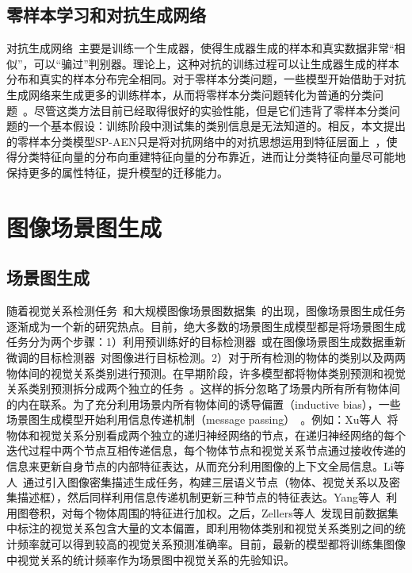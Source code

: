 \subsection{零样本学习和对抗生成网络}
对抗生成网络~\cite{goodfellow2014generative}主要是训练一个生成器，使得生成器生成的样本和真实数据非常“相似”，可以“骗过”判别器。理论上，这种对抗的训练过程可以让生成器生成的样本分布和真实的样本分布完全相同。对于零样本分类问题，一些模型开始借助于对抗生成网络来生成更多的训练样本，从而将零样本分类问题转化为普通的分类问题~\cite{mishra2018generative,xian2018feature,xian2019f}。尽管这类方法目前已经取得很好的实验性能，但是它们违背了零样本分类问题的一个基本假设：训练阶段中测试集的类别信息是无法知道的。相反，本文提出的零样本分类模型SP-AEN只是将对抗网络中的对抗思想运用到特征层面上~\cite{odena2017conditional,tzeng2017adversarial,makhzani2015adversarial,shrivastava2017learning}，使得分类特征向量的分布向重建特征向量的分布靠近，进而让分类特征向量尽可能地保持更多的属性特征，提升模型的迁移能力。



\section{图像场景图生成}

\subsection{场景图生成}
随着视觉关系检测任务~\cite{lu2016visual}和大规模图像场景图数据集~\cite{krishna2017visual}的出现，图像场景图生成任务逐渐成为一个新的研究热点。目前，绝大多数的场景图生成模型都是将场景图生成任务分为两个步骤：1）利用预训练好的目标检测器~\cite{lu2016visual,zhuang2017towards,zhang2017visual,dai2017detecting,yang2018shuffle,yu2017visual}或在图像场景图生成数据重新微调的目标检测器~\cite{li2017vip,xu2017scene,yin2018zoom,zellers2018neural,zhang2017relationship,zhang2019large}对图像进行目标检测。2）对于所有检测的物体的类别以及两两物体间的视觉关系类别进行预测。在早期阶段，许多模型都将物体类别预测和视觉关系类别预测拆分成两个独立的任务~\cite{lu2016visual,zhang2017visual,zhuang2017towards,zhu2018deep,zhang2017relationship}。这样的拆分忽略了场景内所有所有物体间的内在联系。为了充分利用场景内所有物体间的诱导偏置（inductive bias），一些场景图生成模型开始利用信息传递机制（message passing）~\cite{xu2017scene,dai2017detecting,li2017scene,li2018factorizable,yin2018zoom,jae2018tensorize,yang2018graph,tang2019learning,gu2019scene,qi2019attentive,wang2019exploring}。例如：Xu等人~\cite{xu2017scene}将物体和视觉关系分别看成两个独立的递归神经网络的节点，在递归神经网络的每个迭代过程中两个节点互相传递信息，每个物体节点和视觉关系节点通过接收传递的信息来更新自身节点的内部特征表达，从而充分利用图像的上下文全局信息。Li等人~\cite{li2017scene}通过引入图像密集描述生成任务，构建三层语义节点（物体、视觉关系以及密集描述框），然后同样利用信息传递机制更新三种节点的特征表达。Yang等人~\cite{yang2018graph}利用图卷积，对每个物体周围的特征进行加权。之后，Zellers等人~\cite{zellers2018neural}发现目前数据集中标注的视觉关系包含大量的文本偏置，即利用物体类别和视觉关系类别之间的统计频率就可以得到较高的视觉关系预测准确率。目前，最新的模型都将训练集图像中视觉关系的统计频率作为场景图中视觉关系的先验知识。


